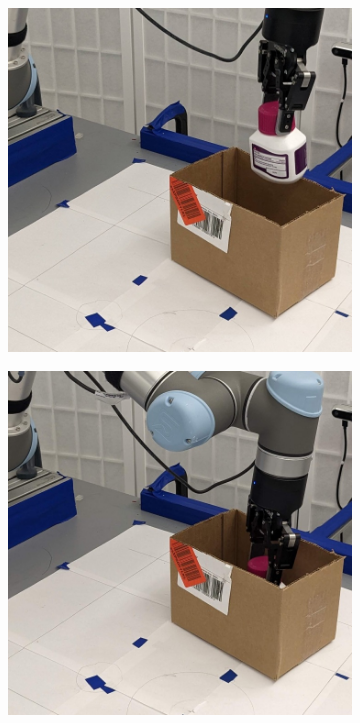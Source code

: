 \documentclass{article}
\begin{document}
\begin{figure}[]
\begin{subfigure}{(\linewidth - 0.05\linewidth)/5}
    \end{subfigure}
    \begin{subfigure}{(\linewidth - 0.05\linewidth)/5}
        \centering
        \includegraphics[width=\linewidth]{figures/episodes/bottle_in_box/4.jpg}
    \end{subfigure}
    \begin{subfigure}{(\linewidth - 0.05\linewidth)/5}
        \centering
        \includegraphics[width=\linewidth]{figures/episodes/bottle_in_box/3.jpg}

\end{subfigure}
\end{figure}
\end{document}
